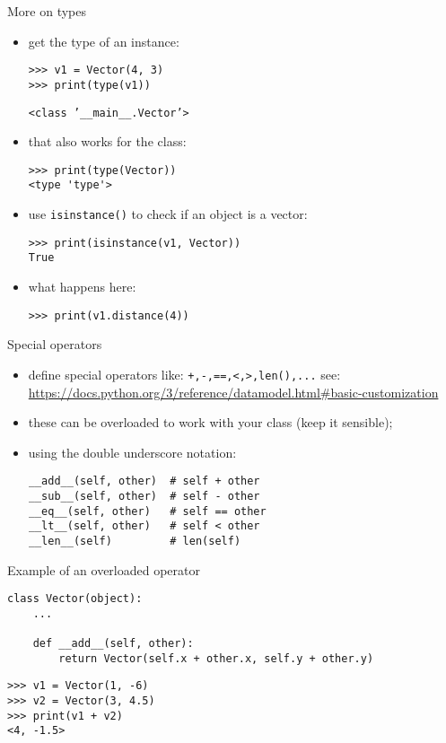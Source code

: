 \documentclass{beamer}
\begin{document}
\begin{frame}[fragile]{More on types}
\begin{itemize}
\item get the type of an instance:
\begin{verbatim}
>>> v1 = Vector(4, 3)
>>> print(type(v1))
\end{verbatim}
\vspace{-.08cm}
\texttt{<class}\texttt{ '__main__.Vector'>}

\item that also works for the class:
\begin{verbatim}
>>> print(type(Vector))
<type 'type'>
\end{verbatim}

\item use \texttt{isinstance()} to check if an object is a
vector:
\begin{verbatim}
>>> print(isinstance(v1, Vector))
True
\end{verbatim}

\item what happens here:
\begin{verbatim}
>>> print(v1.distance(4))
\end{verbatim}
\end{itemize}
\end{frame}

\begin{frame}[fragile]{Special operators}
\begin{itemize}
\item define special operators like:
\texttt{+,-,==,<,>,len(),...}
see: \url{https://docs.python.org/3/reference/datamodel.html#basic-customization}

\item these can be \textcolor{pms280_compl}{overloaded} to work with your
class (keep it sensible);
\item using the double underscore notation:
\begin{verbatim}
__add__(self, other)  # self + other
__sub__(self, other)  # self - other
__eq__(self, other)   # self == other
__lt__(self, other)   # self < other
__len__(self)         # len(self)
\end{verbatim}
\end{itemize}
\end{frame}

\begin{frame}[fragile]{Example of an overloaded operator}
\begin{verbatim}
class Vector(object):
    ...

    def __add__(self, other):
        return Vector(self.x + other.x, self.y + other.y)
\end{verbatim}

\bigskip

\begin{verbatim}
>>> v1 = Vector(1, -6)
>>> v2 = Vector(3, 4.5)
>>> print(v1 + v2)
<4, -1.5>
\end{verbatim}
\end{frame}
\end{document}
